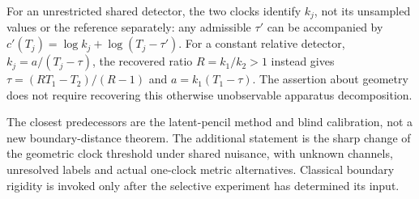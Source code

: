 For an unrestricted shared detector, the two clocks identify $k_j$,
not its unsampled values or the reference separately: any admissible
$\tau'$ can be accompanied by
$c'(T_j)=\log k_j+\log(T_j-\tau')$. For a constant relative detector,
$k_j=a/(T_j-\tau)$, the recovered ratio $R=k_1/k_2>1$ instead gives
$\tau=(RT_1-T_2)/(R-1)$ and $a=k_1(T_1-\tau)$. The assertion about
geometry does not require recovering this otherwise unobservable
apparatus decomposition.

The closest predecessors are the latent-pencil method and blind
calibration, not a new boundary-distance theorem. The additional
statement is the sharp change of the geometric clock threshold under
shared nuisance, with unknown channels, unresolved labels and actual
one-clock metric alternatives. Classical boundary rigidity is invoked
only after the selective experiment has determined its input.
